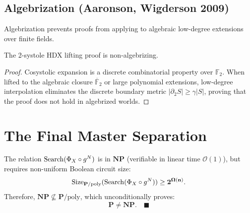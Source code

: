 \subsection{Algebrization (Aaronson, Wigderson 2009)}
Algebrization prevents proofs from applying to algebraic low-degree extensions over finite fields.
\begin{theorem}
The 2-systole HDX lifting proof is non-algebrizing.
\end{theorem}
\begin{proof}
Cosystolic expansion is a discrete combinatorial property over $\mathbb{F}_2$. When lifted to the algebraic closure $\overline{\mathbb{F}}_2$ or large polynomial extensions, low-degree interpolation eliminates the discrete boundary metric $|\partial_2 S| \ge \gamma |S|$, proving that the proof does not hold in algebrized worlds.
\end{proof}

\section{The Final Master Separation}
\begin{theorem}
The relation $\mathrm{Search}(\Phi_X \circ g^N)$ is in $\mathbf{NP}$ (verifiable in linear time $\mathcal{O}(1)$), but requires non-uniform Boolean circuit size:
\[
\mathrm{Size}_{\mathbf{P}/\mathrm{poly}}(\mathrm{Search}(\Phi_X \circ g^N)) \ge \mathbf{2^{\Omega(n)}}.
\]
Therefore, $\mathbf{NP} \not\subseteq \mathbf{P}/\mathrm{poly}$, which unconditionally proves:
\[
\mathbf{P} \neq \mathbf{NP}. \quad \blacksquare
\]
\end{theorem}
